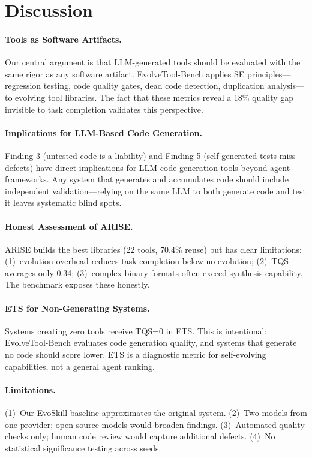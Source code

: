 \documentclass[]{ceurart}
\begin{document}
\section{Discussion}

\paragraph{Tools as Software Artifacts.} Our central argument is that LLM-generated tools should be evaluated with the same rigor as any software artifact. EvolveTool-Bench applies SE principles---regression testing, code quality gates, dead code detection, duplication analysis---to evolving tool libraries. The fact that these metrics reveal a 18\% quality gap invisible to task completion validates this perspective.

\paragraph{Implications for LLM-Based Code Generation.} Finding 3 (untested code is a liability) and Finding 5 (self-generated tests miss defects) have direct implications for LLM code generation tools beyond agent frameworks. Any system that generates and accumulates code should include independent validation---relying on the same LLM to both generate code and test it leaves systematic blind spots.

\paragraph{Honest Assessment of ARISE.} ARISE builds the best libraries (22 tools, 70.4\% reuse) but has clear limitations: (1)~evolution overhead reduces task completion below no-evolution; (2)~TQS averages only 0.34; (3)~complex binary formats often exceed synthesis capability. The benchmark exposes these honestly.

\paragraph{ETS for Non-Generating Systems.} Systems creating zero tools receive TQS=0 in ETS. This is intentional: EvolveTool-Bench evaluates code generation quality, and systems that generate no code should score lower. ETS is a diagnostic metric for self-evolving capabilities, not a general agent ranking.

\paragraph{Limitations.} (1)~Our EvoSkill baseline approximates the original system. (2)~Two models from one provider; open-source models would broaden findings. (3)~Automated quality checks only; human code review would capture additional defects. (4)~No statistical significance testing across seeds.
\end{document}
